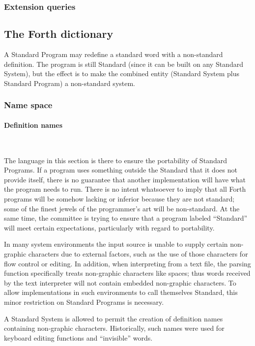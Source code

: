 \subsubsection{Extension queries} %

\subsection{The Forth dictionary} %

A Standard Program may redefine a standard word with a non-standard
definition. The program is still Standard (since it can be built on
any Standard System), but the effect is to make the combined entity
(Standard System plus Standard Program) a non-standard system.

\subsubsection{Name space} %

\setcounter{paragraph}{1}
\paragraph{Definition names} ~ %

The language in this section is there to ensure the portability of
Standard Programs. If a program uses something outside the Standard
that it does not provide itself, there is no guarantee that another
implementation will have what the program needs to run. There is no
intent whatsoever to imply that all Forth programs will be somehow
lacking or inferior because they are not standard; some of the finest
jewels of the programmer's art will be non-standard. At the same time,
the committee is trying to ensure that a program labeled ``Standard''
will meet certain expectations, particularly with regard to portability.

In many system environments the input source is unable to supply
certain non-graphic characters due to external factors, such as the
use of those characters for flow control or editing. In addition,
when interpreting from a text file, the parsing function specifically
treats non-graphic characters like spaces; thus words received by the
text interpreter will not contain embedded non-graphic characters. To
allow implementations in such environments to call themselves Standard,
this minor restriction on Standard Programs is necessary.

A Standard System is allowed to permit the creation of definition
names containing non-graphic characters. Historically, such names
were used for keyboard editing functions and ``invisible'' words.


